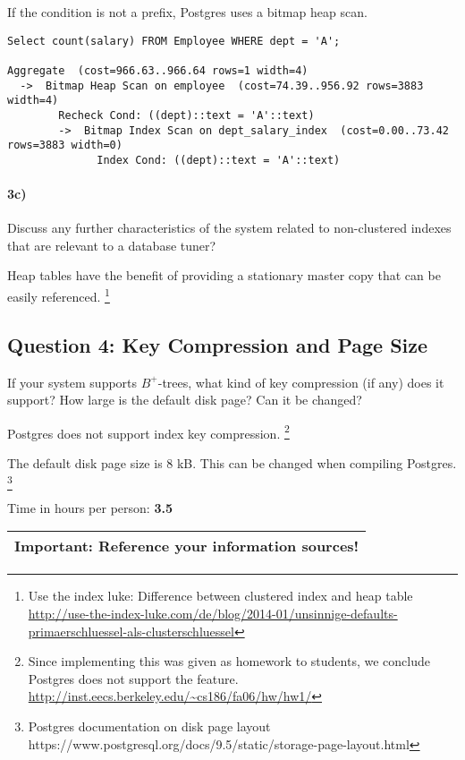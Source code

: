 \documentclass[11pt]{scrartcl}
\begin{document}
If the condition is not a prefix, Postgres uses a bitmap heap scan.

{\small
\begin{verbatim}
Select count(salary) FROM Employee WHERE dept = 'A';

Aggregate  (cost=966.63..966.64 rows=1 width=4)
  ->  Bitmap Heap Scan on employee  (cost=74.39..956.92 rows=3883 width=4)
        Recheck Cond: ((dept)::text = 'A'::text)
        ->  Bitmap Index Scan on dept_salary_index  (cost=0.00..73.42 rows=3883 width=0)
              Index Cond: ((dept)::text = 'A'::text)
\end{verbatim}
}

\paragraph{3c)} Discuss any further characteristics of the system related to
non-clustered indexes that are relevant to a database tuner?

\smallskip

Heap tables have the benefit of providing a stationary master copy that can be easily referenced.
\footnote{Use the index luke: Difference between clustered index and heap table
\url{http://use-the-index-luke.com/de/blog/2014-01/unsinnige-defaults-primaerschluessel-als-clusterschluessel}}

\subsection*{Question 4: Key Compression and Page Size} If your system
supports $B^+$-trees, what kind of key compression (if any) does it
support?  How large is the default disk page? Can it be changed?


\vspace{1em}
Postgres does not support index key compression.
\footnote{Since implementing this was given as homework to students,
we conclude Postgres does not support the feature.
\url{http://inst.eecs.berkeley.edu/~cs186/fa06/hw/hw1/}}

The default disk page size is 8 kB. This can be changed when compiling
Postgres.
\footnote{Postgres documentation on disk page layout 
https://www.postgresql.org/docs/9.5/static/storage-page-layout.html}

\bigskip

\noindent Time in hours per person: {\bf 3.5}

\bigskip

\begin{center}
  \begin{tabular}{c}
    \hline
    {\bf Important:} Reference your information sources!
    \\\hline
  \end{tabular}
\end{center}
\end{document}
